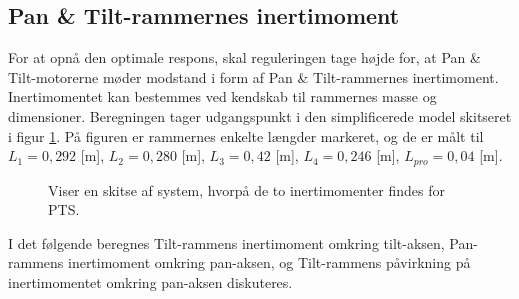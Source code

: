 \subsection{Pan \& Tilt-rammernes inertimoment}
\label{sec:teo_PTS}
For at opnå den optimale respons, skal reguleringen tage højde for, at Pan \& Tilt-motorerne møder modstand i form af
Pan \& Tilt-rammernes inertimoment. Inertimomentet kan bestemmes ved kendskab til rammernes
masse og dimensioner. Beregningen tager udgangspunkt i den simplificerede model skitseret i figur \ref{fig:inerti_PTS}.
På figuren er rammernes enkelte længder markeret, og de er målt til \({L_{1}} =0,292\) [m],
\({L_{2}} =0,280\) [m], \({L_{3}}= 0,42\) [m], \({L_{4}} =0,246\) [m], \({L_{pro}}=0,04\) [m].
\begin{figure}[!th]
\centering
\begin{tikzpicture}[scale=0.8]

\end{tikzpicture}
\caption[Skitse af PTS]{Viser en skitse af system, hvorpå de to inertimomenter findes for PTS.}
\label{fig:inerti_PTS}
\end{figure}

I det følgende beregnes Tilt-rammens inertimoment omkring tilt-aksen,
Pan-rammens inertimoment omkring pan-aksen,
og Tilt-rammens påvirkning på inertimomentet omkring pan-aksen diskuteres.



